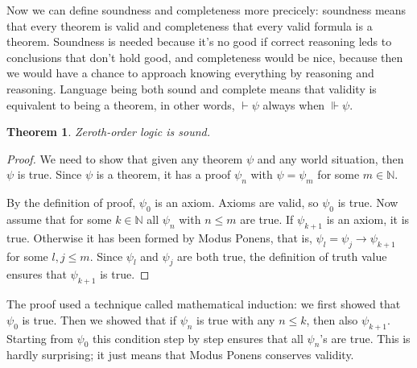 \documentclass[11pt,oneside,%
]{memoir}
\newtheorem{teoreema}{Theorem}
\theoremstyle{definition}
\newcommand{\NN}{\mathbb{N}}
\begin{document}
Now we can define soundness and completeness more precicely: soundness means that every theorem is valid and completeness that every valid formula is a theorem. Soundness is needed because it's no good if correct reasoning leds to conclusions that don't hold good, and completeness would be nice, because then we would have a chance to approach knowing everything by reasoning and reasoning. Language being both sound and complete means that validity is equivalent to being a theorem, in other words, \(\vdash\psi\) always when \(\Vdash\psi\).%
\begin{teoreema}
Zeroth-order logic is sound.
\end{teoreema}
\begin{proof}
We need to show that given any theorem \(\psi\) and any world situation, then \(\psi\) is true. Since \(\psi\) is a theorem, it has a proof \(\psi_n\) with \(\psi=\psi_m\) for some \(m\in\NN\).

By the definition of proof, \(\psi_0\) is an axiom. Axioms are valid, so \(\psi_0\) is true. Now assume that for some \(k\in\NN\) all \(\psi_n\) with \(n\leq m\) are true. If \(\psi_{k+1}\) is an axiom, it is true. Otherwise it has been formed by Modus Ponens, that is, \(\psi_l=\psi_j\rightarrow\psi_{k+1}\) for some \(l,j\leq m\). Since \(\psi_l\) and \(\psi_j\) are both true, the definition of truth value ensures that \(\psi_{k+1}\) is true.
\end{proof}
The proof used a technique called mathematical induction: we first showed that \(\psi_0\) is true. Then we showed that if \(\psi_n\) is true with any \(n\leq k\), then also \(\psi_{k+1}\). Starting from \(\psi_0\) this condition step by step ensures that all \(\psi_n\)'s are true. This is hardly surprising; it just means that Modus Ponens conserves validity.%
\end{document}
